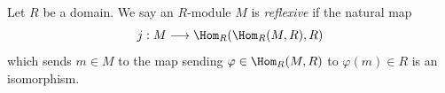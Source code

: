 \begin{definition}
\label{definition-reflexive}
Let $R$ be a domain. We say an $R$-module $M$ is {\it reflexive} if
the natural map
$$
j : M \longrightarrow \Hom_R(\Hom_R(M, R), R)
$$
which sends $m \in M$ to the map sending $\varphi \in \Hom_R(M, R)$
to $\varphi(m) \in R$ is an isomorphism.
\end{definition}